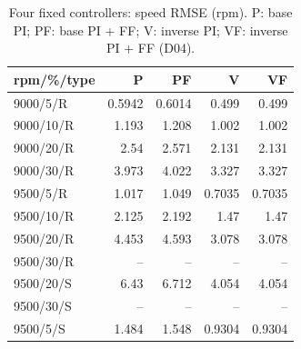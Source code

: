 \begin{table}[htbp]\centering\small\setlength{\tabcolsep}{4pt}\begin{tabular}{@{}lrrrr@{}}\toprule
rpm/\%/type & P & PF & V & VF\\\midrule
9000/5/R & 0.5942 & 0.6014 & 0.499 & 0.499\\
9000/10/R & 1.193 & 1.208 & 1.002 & 1.002\\
9000/20/R & 2.54 & 2.571 & 2.131 & 2.131\\
9000/30/R & 3.973 & 4.022 & 3.327 & 3.327\\
9500/5/R & 1.017 & 1.049 & 0.7035 & 0.7035\\
9500/10/R & 2.125 & 2.192 & 1.47 & 1.47\\
9500/20/R & 4.453 & 4.593 & 3.078 & 3.078\\
9500/30/R & -- & -- & -- & --\\
9500/20/S & 6.43 & 6.712 & 4.054 & 4.054\\
9500/30/S & -- & -- & -- & --\\
9500/5/S & 1.484 & 1.548 & 0.9304 & 0.9304\\
\bottomrule\end{tabular}\caption{Four fixed controllers: speed RMSE (rpm). P: base PI; PF: base PI + FF; V: inverse PI; VF: inverse PI + FF (D04).}\label{tab:fixed_rmse}\end{table}